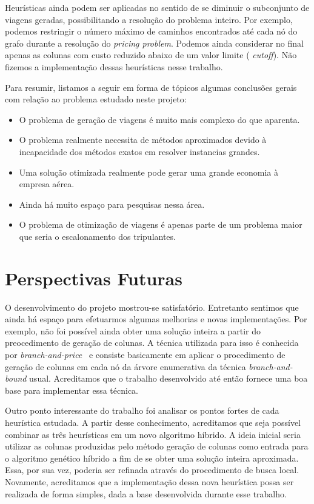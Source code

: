 Heurísticas ainda podem ser aplicadas no sentido de se diminuir o subconjunto de viagens geradas,
possibilitando a resolução do problema inteiro. Por exemplo, podemos restringir o número máximo de
caminhos encontrados até cada nó do grafo durante a resolução do {\it pricing problem}. Podemos
ainda considerar no final apenas as colunas com custo reduzido abaixo de um valor limite ({\it
cutoff}). Não fizemos a implementação dessas heurísticas nesse trabalho.

Para resumir, listamos a seguir em forma de tópicos algumas conclusões gerais com relação ao
problema estudado neste projeto:

\begin{itemize}
\item O problema de geração de viagens é muito mais complexo do que aparenta. 
\item O problema realmente necessita de métodos aproximados devido à incapacidade dos métodos exatos
em resolver instancias grandes.
\item Uma solução otimizada realmente pode gerar uma grande economia à empresa aérea.
\item Ainda há muito espaço para pesquisas nessa área. 
\item O problema de otimização de viagens é apenas parte de um problema maior que seria o
escalonamento dos tripulantes.
\end{itemize}


\section{Perspectivas Futuras}
\label{sec:perspectivas}

O desenvolvimento do projeto mostrou-se satisfatório. Entretanto sentimos que ainda há espaço para
efetuarmos algumas melhorias e novas implementações. Por exemplo, não foi possível ainda obter uma
solução inteira a partir do preocedimento de geração de colunas. A técnica utilizada para isso é
conhecida por {\it branch-and-price}~\cite{vance97h} e consiste basicamente em aplicar o
procedimento de geração de colunas em cada nó da árvore enumerativa da técnica {\it
branch-and-bound} usual. Acreditamos que o trabalho desenvolvido até então fornece uma boa base para
implementar essa técnica.

Outro ponto interessante do trabalho foi analisar os pontos fortes de cada heurística estudada. A
partir desse conhecimento, acreditamos que seja possível combinar as três heurísticas em um novo
algoritmo híbrido. A ideia inicial seria utilizar as colunas produzidas pelo método geração de
colunas como entrada para o algoritmo genético híbrido a fim de se obter uma solução inteira
aproximada. Essa, por sua vez, poderia ser refinada através do procedimento de busca local.
Novamente, acreditamos que a implementação dessa nova heurística possa ser realizada de forma
simples, dada a base desenvolvida durante esse trabalho.

